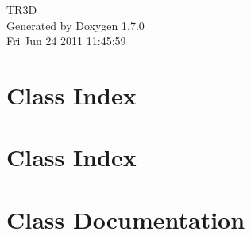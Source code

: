 \documentclass[a4paper]{book}
\begin{document}
\hypersetup{pageanchor=false}
\begin{titlepage}
\vspace*{7cm}
\begin{center}
{\Large TR3D }\\
\vspace*{1cm}
{\large Generated by Doxygen 1.7.0}\\
\vspace*{0.5cm}
{\small Fri Jun 24 2011 11:45:59}\\
\end{center}
\end{titlepage}
\clearemptydoublepage
{}
\tableofcontents
\clearemptydoublepage
{}
\hypersetup{pageanchor=true}
\chapter{Class Index}

\chapter{Class Index}

\chapter{Class Documentation}










































\printindex
\end{document}

